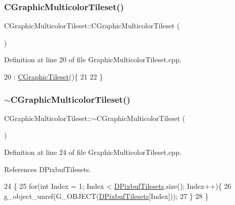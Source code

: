 \subsubsection{\texorpdfstring{C\+Graphic\+Multicolor\+Tileset()}{CGraphicMulticolorTileset()}}
{\footnotesize\ttfamily C\+Graphic\+Multicolor\+Tileset\+::\+C\+Graphic\+Multicolor\+Tileset (\begin{DoxyParamCaption}{ }\end{DoxyParamCaption})}



Definition at line 20 of file Graphic\+Multicolor\+Tileset.\+cpp.


\begin{DoxyCode}
20                                                      : \hyperlink{classCGraphicTileset_a871889683273be71a94c73776fcd507b}{CGraphicTileset}()\{
21     
22 \}
\end{DoxyCode}
\hypertarget{classCGraphicMulticolorTileset_aa454897de796ad7048f6bb64fdd5311e}{}\label{classCGraphicMulticolorTileset_aa454897de796ad7048f6bb64fdd5311e} 
\subsubsection{\texorpdfstring{$\sim$\+C\+Graphic\+Multicolor\+Tileset()}{~CGraphicMulticolorTileset()}}
{\footnotesize\ttfamily C\+Graphic\+Multicolor\+Tileset\+::$\sim$\+C\+Graphic\+Multicolor\+Tileset (\begin{DoxyParamCaption}{ }\end{DoxyParamCaption})\hspace{0.3cm}{\ttfamily [virtual]}}



Definition at line 24 of file Graphic\+Multicolor\+Tileset.\+cpp.



References D\+Pixbuf\+Tilesets.


\begin{DoxyCode}
24                                                      \{
25     \textcolor{keywordflow}{for}(\textcolor{keywordtype}{int} Index = 1; Index < \hyperlink{classCGraphicMulticolorTileset_a30809d113b0f314944425a3c8f21408c}{DPixbufTilesets}.size(); Index++)\{
26         g\_object\_unref(G\_OBJECT(\hyperlink{classCGraphicMulticolorTileset_a30809d113b0f314944425a3c8f21408c}{DPixbufTilesets}[Index]));   
27     \}
28 \}
\end{DoxyCode}


